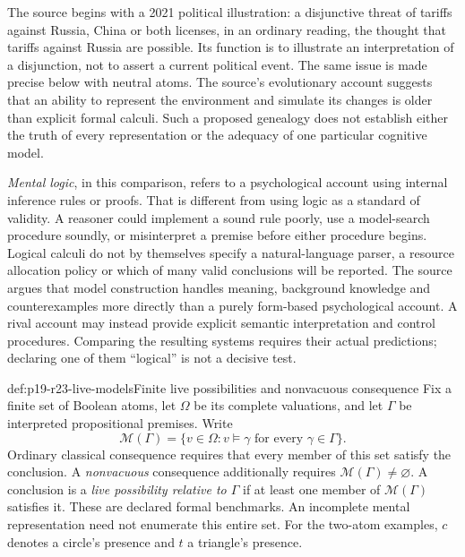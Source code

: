 The source begins with a 2021 political illustration: a disjunctive threat
of tariffs against Russia, China or both licenses, in an ordinary reading,
the thought that tariffs against Russia are possible. Its function is to
illustrate an interpretation of a disjunction, not to assert a current
political event. The same issue is made precise below with neutral atoms.
The source's evolutionary account suggests that an ability to represent
the environment and simulate its changes is older than explicit formal
calculi. Such a proposed genealogy does not establish either the truth
of every representation or the adequacy of one particular cognitive model.

\emph{Mental logic}, in this comparison, refers to a psychological account
using internal inference rules or proofs. That is different from using
logic as a standard of validity. A reasoner could implement a sound rule
poorly, use a model-search procedure soundly, or misinterpret a premise
before either procedure begins. Logical calculi do not by themselves
specify a natural-language parser, a resource allocation policy or which
of many valid conclusions will be reported. The source argues that model
construction handles meaning, background knowledge and counterexamples
more directly than a purely form-based psychological account. A rival
account may instead provide explicit semantic interpretation and control
procedures. Comparing the resulting systems requires their actual
predictions; declaring one of them ``logical'' is not a decisive test.

\begin{hbdefinition}{def:p19-r23-live-models}{Finite live possibilities and nonvacuous consequence}
Fix a finite set of Boolean atoms, let \(\Omega\) be its complete
valuations, and let \(\Gamma\) be interpreted propositional premises.
Write
\[
 \mathcal M(\Gamma)=\{v\in\Omega: v\models\gamma
                         \text{ for every }\gamma\in\Gamma\}.
\]
Ordinary classical consequence requires that every member of this set
satisfy the conclusion. A \emph{nonvacuous} consequence additionally
requires \(\mathcal M(\Gamma)\ne\varnothing\). A conclusion is a
\emph{live possibility relative to \(\Gamma\)} if at least one member
of \(\mathcal M(\Gamma)\) satisfies it. These are declared formal
benchmarks. An incomplete mental representation need not enumerate this
entire set.
For the two-atom examples, \(c\) denotes a circle's presence and \(t\)
a triangle's presence.
\end{hbdefinition}

